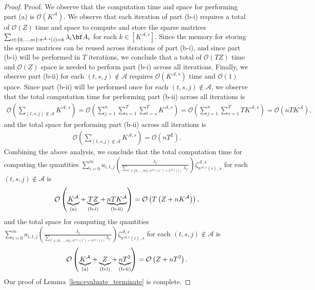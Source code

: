 \documentclass[nonblindrev,mnsc]{informs3} %
\newcommand{\bba}{{\bf A}}
\begin{document}
\begin{APPENDICES}
\begin{proof}{Proof.}
We observe that the computation time and space for performing part (a) is $\mathcal{O}(K^{\mathcal{A}})$.  We observe that each iteration of part (b-i) requires a total of $\mathcal{O}(Z)$ time and space to compute and store the sparse matrices $\sum_{i \in \{0,\ldots,m\}: \pi^{\mathcal{A},s}(i) = k}  \lambda_i \bba_{i}$  for each $k \in [K^{\mathcal{A},s}]$. Since the memory for storing the sparse matrices can be reused across iterations of part (b-i), and since part (b-i) will be performed in $T$ iterations, we conclude that a total of $\mathcal{O}(TZ)$ time and $\mathcal{O}(Z)$ space is needed to perform part (b-i) across all iterations.  Finally, we observe  part (b-ii) for each $(t,s,j) \notin \mathcal{A}$ requires $\mathcal{O}(K^{\mathcal{A},s})$ time and $\mathcal{O}(1)$ space. Since part (b-ii) will be performed once for each $(t,s,j) \notin \mathcal{A}$, we observe that the total computation time for performing part (b-ii) across all iterations is 
\begin{align*}
    \mathcal{O} \left(\sum_{(t,s,j) \notin \mathcal{A}} K^{\mathcal{A},s} \right) =    \mathcal{O} \left(\sum_{j=1}^n \sum_{s=1}^T \sum_{t=s}^T  K^{\mathcal{A},s} \right) =  \mathcal{O} \left(\sum_{j=1}^n \sum_{s=1}^T T  K^{\mathcal{A},s} \right)  =   \mathcal{O}\left(nT K^{\mathcal{A}} \right),
\end{align*}
and the total space for performing part (b-ii) across all iterations is
\begin{align*}
    \mathcal{O} \left(\sum_{(t,s,j) \notin \mathcal{A}} K^{\mathcal{A},s} \right)  = \mathcal{O}(n T^2). 
\end{align*}
Combining the above analysis, we conclude that the total computation time for computing the quantities $\sum_{i=0}^m   a_{i,t,j} \left( \frac{\lambda_i}{\sum_{i' \in \{0,\ldots,m\}: \pi^{\mathcal{A},s}(i') = \pi^{\mathcal{A},s}(i)} \lambda_{i'}} \right) \zeta^{\mathcal{A},s}_{\pi^{\mathcal{A},s}(i),s}$  for each $(t,s,j) \notin \mathcal{A}$ is
\begin{align*}
    \mathcal{O}\left(\underbrace{K^{\mathcal{A}}}_{\textnormal{(a)}} +  \underbrace{TZ}_{\textnormal{(b-i)}} +   \underbrace{nT K^{\mathcal{A}}}_{\textnormal{(b-ii)}}\right) = \mathcal{O} \left( T \left( Z + n K^{\mathcal{A}} \right) \right),
\end{align*}
and the total space for computing the quantities $\sum_{i=0}^m   a_{i,t,j} \left( \frac{\lambda_i}{\sum_{i' \in \{0,\ldots,m\}: \pi^{\mathcal{A},s}(i') = \pi^{\mathcal{A},s}(i)} \lambda_{i'}} \right) \zeta^{\mathcal{A},s}_{\pi^{\mathcal{A},s}(i),s}$  for each $(t,s,j) \notin \mathcal{A}$ is
\begin{align*}
    \mathcal{O}\left(\underbrace{K^{\mathcal{A}}}_{\textnormal{(a)}} +  \underbrace{Z}_{\textnormal{(b-i)}} +   \underbrace{nT^2}_{\textnormal{(b-ii)}}\right) = \mathcal{O} \left( Z + nT^2\right).
\end{align*}
Our proof of Lemma~\ref{lem:evaluate_terminate} is complete. 
\halmos \end{proof}


\end{APPENDICES}
\end{document}
